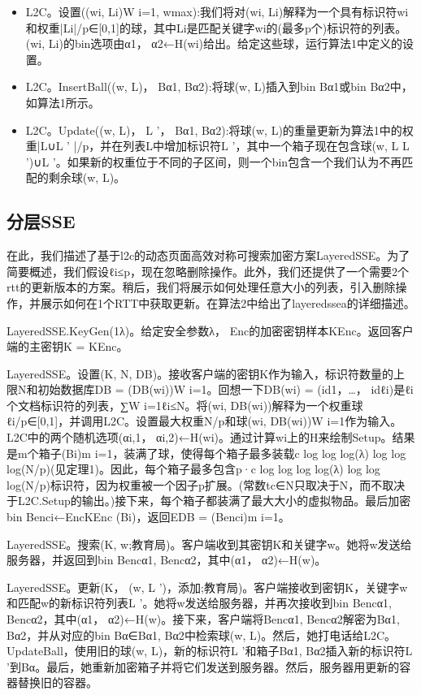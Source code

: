 \documentclass[UTF8]{article}
\begin{document}
\begin{itemize}
  \item L2C。设置({(wi, Li)}W i=1, wmax):我们将对(wi, Li)解释为一个具有标识符wi和权重|Li|/p∈[0,1]的球，其中Li是匹配关键字wi的(最多p个)标识符的列表。(wi, Li)的bin选项由α1， α2←H(wi)给出。给定这些球，运行算法1中定义的设置。
  \item L2C。InsertBall((w, L)， Bα1, Bα2):将球(w, L)插入到bin Bα1或bin Bα2中，如算法1所示。
  \item L2C。Update((w, L)， L '， Bα1, Bα2):将球(w, L)的重量更新为算法1中的权重|L∪L ' |/p，并在列表L中增加标识符L '，其中一个箱子现在包含球(w, L L ')∪L '。如果新的权重位于不同的子区间，则一个bin包含一个我们认为不再匹配的剩余球(w, L)。
\end{itemize}

\subsection{分层SSE}
在此，我们描述了基于l2c的动态页面高效对称可搜索加密方案LayeredSSE。为了简要概述，我们假设ℓi≤p，现在忽略删除操作。此外，我们还提供了一个需要2个rtt的更新版本的方案。稍后，我们将展示如何处理任意大小的列表，引入删除操作，并展示如何在1个RTT中获取更新。在算法2中给出了layeredssea的详细描述。

LayeredSSE.KeyGen(1λ)。给定安全参数λ， Enc的加密密钥样本KEnc。返回客户端的主密钥K = KEnc。

LayeredSSE。设置(K, N, DB)。接收客户端的密钥K作为输入，标识符数量的上限N和初始数据库DB = (DB(wi))W i=1。回想一下DB(wi) = (id1，…， idℓi)是ℓi个文档标识符的列表，∑W i=1ℓi≤N。将(wi, DB(wi))解释为一个权重球ℓi/p∈[0,1]，并调用L2C。设置最大权重N/p和球(wi, DB(wi))W i=1作为输入。L2C中的两个随机选项(αi,1， αi,2)←H(wi)。通过计算wi上的H来绘制Setup。结果是m个箱子(Bi)m i=1，装满了球，使得每个箱子最多装载c log log log(λ) log log log(N/p)(见定理1)。因此，每个箱子最多包含p·c log log log log(λ) log log log(N/p)标识符，因为权重被一个因子p扩展。(常数tc∈N只取决于N，而不取决于L2C.Setup的输出。)接下来，每个箱子都装满了最大大小的虚拟物品。最后加密bin Benci←EncKEnc (Bi)，返回EDB = (Benci)m i=1。

LayeredSSE。搜索(K, w;教育局)。客户端收到其密钥K和关键字w。她将w发送给服务器，并返回到bin Bencα1, Bencα2，其中(α1， α2)←H(w)。

LayeredSSE。更新(K， (w, L ')，添加;教育局)。客户端接收到密钥K，关键字w和匹配w的新标识符列表L '。她将w发送给服务器，并再次接收到bin Bencα1, Bencα2，其中(α1， α2)←H(w)。接下来，客户端将Bencα1, Bencα2解密为Bα1, Bα2，并从对应的bin Bα∈{Bα1, Bα2}中检索球(w, L)。然后，她打电话给L2C。UpdateBall，使用旧的球(w, L)，新的标识符L '和箱子Bα1, Bα2插入新的标识符L '到Bα。最后，她重新加密箱子并将它们发送到服务器。然后，服务器用更新的容器替换旧的容器。
\end{document}
